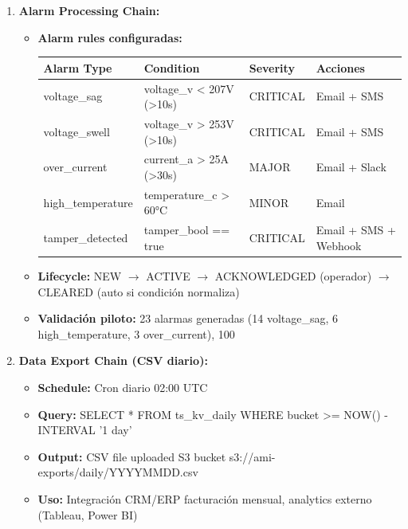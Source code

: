 \begin{enumerate}
    \item \textbf{Alarm Processing Chain:}
    \begin{itemize}
        \item \textbf{Alarm rules configuradas:}
        \begin{table}[H]
        \centering
        \small
        \begin{tabular}{|l|l|l|l|}
        \hline
        \textbf{Alarm Type} & \textbf{Condition} & \textbf{Severity} & \textbf{Acciones} \\
        \hline
        voltage\_sag & voltage\_v < 207V (>10s) & CRITICAL & Email + SMS \\
        voltage\_swell & voltage\_v > 253V (>10s) & CRITICAL & Email + SMS \\
        over\_current & current\_a > 25A (>30s) & MAJOR & Email + Slack \\
        high\_temperature & temperature\_c > 60°C & MINOR & Email \\
        tamper\_detected & tamper\_bool == true & CRITICAL & Email + SMS + Webhook \\
        \hline
        \end{tabular}
        \end{table}
        \item \textbf{Lifecycle:} NEW $\rightarrow$ ACTIVE $\rightarrow$ ACKNOWLEDGED (operador) $\rightarrow$ CLEARED (auto si condición normaliza)~\cite{alsafranChallengesImplementingIoT2025}
        \item \textbf{Validación piloto:} 23 alarmas generadas (14 voltage\_sag, 6 high\_temperature, 3 over\_current), 100\\%
    \end{itemize}
    
    \item \textbf{Data Export Chain (CSV diario):}
    \begin{itemize}
        \item \textbf{Schedule:} Cron diario 02:00 UTC
        \item \textbf{Query:} SELECT * FROM ts\_kv\_daily WHERE bucket >= NOW() - INTERVAL '1 day'
        \item \textbf{Output:} CSV file uploaded S3 bucket s3://ami-exports/daily/YYYYMMDD.csv
        \item \textbf{Uso:} Integración CRM/ERP facturación mensual, analytics externo (Tableau, Power BI)
    \end{itemize}
\end{enumerate}

